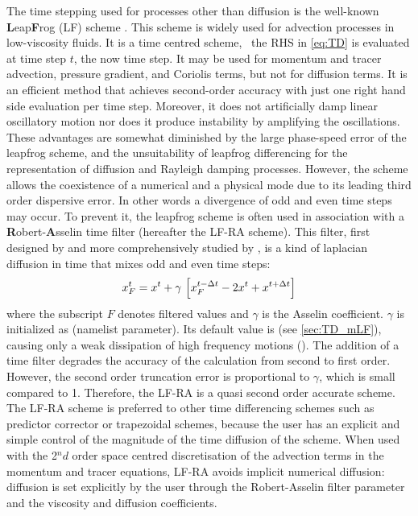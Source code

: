\documentclass[../main/NEMO_manual]{subfiles}
\begin{document}
The time stepping used for processes other than diffusion is
the well-known \textbf{L}eap\textbf{F}rog (LF) scheme \citep{mesinger.arakawa_bk76}.
This scheme is widely used for advection processes in low-viscosity fluids.
It is a time centred scheme, \ie\ the RHS in \autoref{eq:TD} is evaluated at
time step $t$, the now time step.
It may be used for momentum and tracer advection, pressure gradient, and Coriolis terms,
but not for diffusion terms.
It is an efficient method that achieves second-order accuracy with
just one right hand side evaluation per time step.
Moreover, it does not artificially damp linear oscillatory motion
nor does it produce instability by amplifying the oscillations.
These advantages are somewhat diminished by the large phase-speed error of the leapfrog scheme,
and the unsuitability of leapfrog differencing for the representation of diffusion and
Rayleigh damping processes.
However, the scheme allows the coexistence of a numerical and a physical mode due to
its leading third order dispersive error.
In other words a divergence of odd and even time steps may occur.
To prevent it, the leapfrog scheme is often used in association with
a \textbf{R}obert-\textbf{A}sselin time filter (hereafter the LF-RA scheme).
This filter,
first designed by \citet{robert_JMSJ66} and more comprehensively studied by \citet{asselin_MWR72},
is a kind of laplacian diffusion in time that mixes odd and even time steps:
\begin{equation}
  \label{eq:TD_asselin}
  x_F^t = x^t + \gamma \, \left[ x_F^{t - \Delta t} - 2 x^t + x^{t + \Delta t} \right]
\end{equation}
where the subscript $F$ denotes filtered values and $\gamma$ is the Asselin coefficient.
$\gamma$ is initialized as  (namelist parameter).
Its default value is  (see \autoref{sec:TD_mLF}),
causing only a weak dissipation of high frequency motions (\citep{farge-coulombier_phd87}).
The addition of a time filter degrades the accuracy of the calculation from second to first order.
However, the second order truncation error is proportional to $\gamma$, which is small compared to 1.
Therefore, the LF-RA is a quasi second order accurate scheme.
The LF-RA scheme is preferred to other time differencing schemes such as
predictor corrector or trapezoidal schemes, because the user has an explicit and simple control of
the magnitude of the time diffusion of the scheme.
When used with the 2$^nd$ order space centred discretisation of the advection terms in
the momentum and tracer equations, LF-RA avoids implicit numerical diffusion:
diffusion is set explicitly by the user through the Robert-Asselin filter parameter and
the viscosity and diffusion coefficients.
\end{document}
